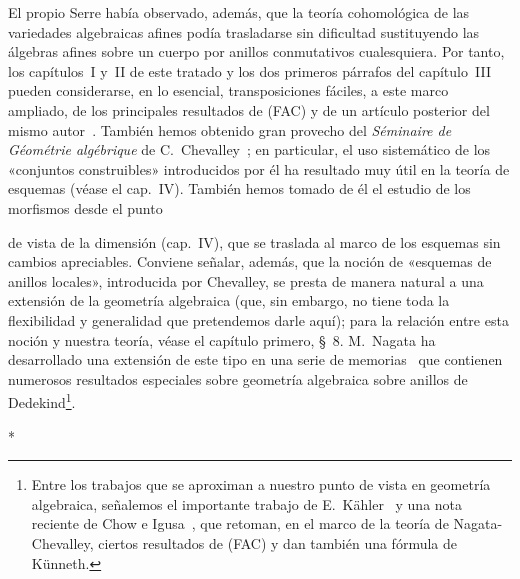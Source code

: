 El propio Serre había observado, además, que la teoría cohomológica de las variedades algebraicas afines podía trasladarse sin dificultad sustituyendo las álgebras afines sobre un cuerpo por anillos conmutativos cualesquiera.
Por tanto, los capítulos~I y~II de este tratado y los dos primeros párrafos del capítulo~III pueden considerarse, en lo esencial, transposiciones fáciles, a este marco ampliado, de los principales resultados de (FAC) y de un artículo posterior del mismo autor~\cite{I-15}.
También hemos obtenido gran provecho del \emph{Séminaire de Géométrie algébrique} de C.~Chevalley~\cite{I-1}; en particular, el uso sistemático de los «conjuntos construibles» introducidos por él ha resultado muy útil en la teoría de esquemas (véase el cap.~IV).
También hemos tomado de él el estudio de los morfismos desde el punto

de vista de la dimensión (cap.~IV), que se traslada al marco de los esquemas sin cambios apreciables.
Conviene señalar, además, que la noción de «esquemas de anillos locales», introducida por Chevalley, se presta de manera natural a una extensión de la geometría algebraica (que, sin embargo, no tiene toda la flexibilidad y generalidad que pretendemos darle aquí); para la relación entre esta noción y nuestra teoría, véase el capítulo primero, \S~8.
M.~Nagata ha desarrollado una extensión de este tipo en una serie de memorias~\cite{I-9} que contienen numerosos resultados especiales sobre geometría algebraica sobre anillos de Dedekind\footnote{Entre los trabajos que se aproximan a nuestro punto de vista en geometría algebraica, señalemos el importante trabajo de E.~Kähler~\cite{I-22} y una nota reciente de Chow e Igusa~\cite{I-3}, que retoman, en el marco de la teoría de Nagata-Chevalley, ciertos resultados de (FAC) y dan también una fórmula de Künneth.}.

\bigskip
\begin{center}*\quad*\quad*\end{center}
\bigskip
